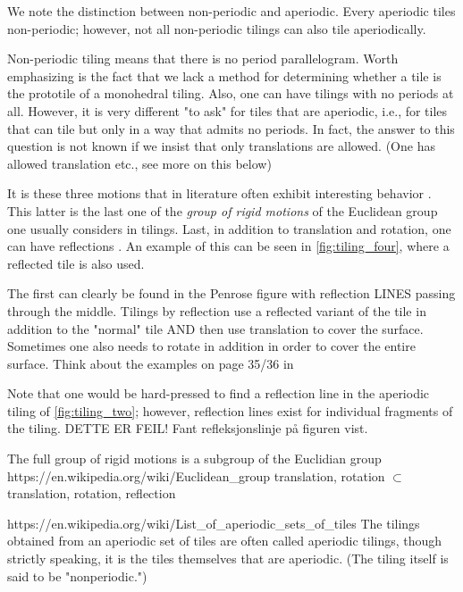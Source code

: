 



We note the distinction between non-periodic and aperiodic. 
Every aperiodic tiles non-periodic; however, not all non-periodic tilings can also tile aperiodically. 



Non-periodic tiling means that there is no period parallelogram.  
Worth emphasizing is the fact that we lack a method for determining whether a tile is the prototile of a monohedral tiling. 
Also, one can have tilings with no periods at all. However, it is very different "to ask" for tiles that are aperiodic, i.e., 
for tiles that can tile but only in a way that admits no periods. In fact, the answer to this question is not known if we insist that only 
translations are allowed. (One has allowed translation etc., see more on this below)



It is these three motions that in literature often exhibit interesting behavior \cite{kolountzakisTilingsTranslation2010}. 
This latter is the last one of the \emph{group of rigid motions} of the Euclidean group one usually considers in tilings. %
Last, in addition to translation and rotation, one can have reflections \cite{kolountzakisTilingsTranslation2010}. 
An example of this can be seen in \cref{fig:tiling_four}, where a reflected tile is also used.

The first can clearly be found in the Penrose figure with reflection LINES passing through the middle. 
Tilings by reflection use a reflected variant of the tile in addition to the "normal" tile AND then use translation to cover the surface. 
Sometimes one also needs to rotate in addition in order to cover the entire surface. 
Think about the examples on page 35/36 in \cite{grunbaumTilingsPatterns1987}


Note that one would be hard-pressed to find a reflection line in the aperiodic tiling of \cref{fig:tiling_two}; however, reflection lines exist for 
individual fragments of the tiling. DETTE ER FEIL! Fant refleksjonslinje på figuren vist.

The full group of rigid motions is a subgroup of the Euclidian group https://en.wikipedia.org/wiki/Euclidean_group
translation, rotation $\subset$ translation, rotation, reflection

https://en.wikipedia.org/wiki/List_of_aperiodic_sets_of_tiles
The tilings obtained from an aperiodic set of tiles are often called aperiodic tilings, though strictly speaking, it is the tiles themselves 
that are aperiodic. (The tiling itself is said to be "nonperiodic.")
